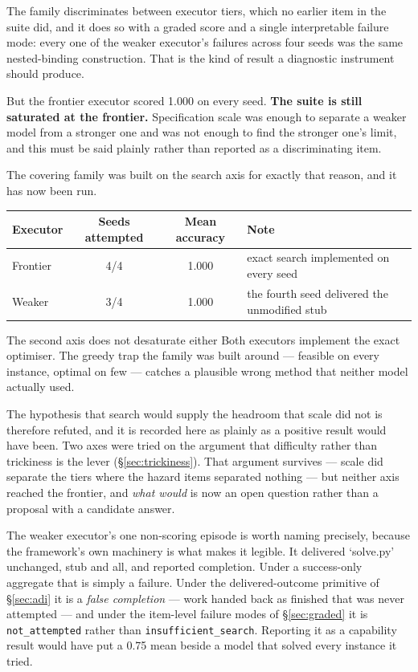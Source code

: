 \documentclass[11pt]{article}
\theoremstyle{definition}
\begin{document}
The family discriminates between executor tiers, which no earlier item in the suite did, and it does so with a graded score and a single interpretable failure mode: every one of the weaker executor's failures across four seeds was the same nested-binding construction. That is the kind of result a diagnostic instrument should produce.

But the frontier executor scored 1.000 on every seed. \textbf{The suite is still saturated at the frontier.} Specification scale was enough to separate a weaker model from a stronger one and was not enough to find the stronger one's limit, and this must be said plainly rather than reported as a discriminating item.

The covering family was built on the search axis for exactly that reason, and it has now been run.

\begin{table}[h]
\centering\small
\begin{tabularx}{\textwidth}{@{}lccY@{}}
\toprule
Executor & Seeds attempted & Mean accuracy & Note \\
\midrule
Frontier & 4/4 & 1.000 & exact search implemented on every seed \\
Weaker & 3/4 & 1.000 & the fourth seed delivered the unmodified stub \\
\bottomrule
\end{tabularx}
\end{table}

\begin{cautionbox}{The second axis does not desaturate either}
Both executors implement the exact optimiser. The greedy trap the family was built around --- feasible on every instance, optimal on few --- catches a plausible wrong method that neither model actually used.

The hypothesis that search would supply the headroom that scale did not is therefore refuted, and it is recorded here as plainly as a positive result would have been. Two axes were tried on the argument that difficulty rather than trickiness is the lever (\S\ref{sec:trickiness}). That argument survives --- scale did separate the tiers where the hazard items separated nothing --- but neither axis reached the frontier, and \emph{what would} is now an open question rather than a proposal with a candidate answer.
\end{cautionbox}

The weaker executor's one non-scoring episode is worth naming precisely, because the framework's own machinery is what makes it legible. It delivered `solve.py' unchanged, stub and all, and reported completion. Under a success-only aggregate that is simply a failure. Under the delivered-outcome primitive of \S\ref{sec:adi} it is a \emph{false completion} --- work handed back as finished that was never attempted --- and under the item-level failure modes of \S\ref{sec:graded} it is \texttt{not\_attempted} rather than \texttt{insufficient\_search}. Reporting it as a capability result would have put a 0.75 mean beside a model that solved every instance it tried.
\end{document}
